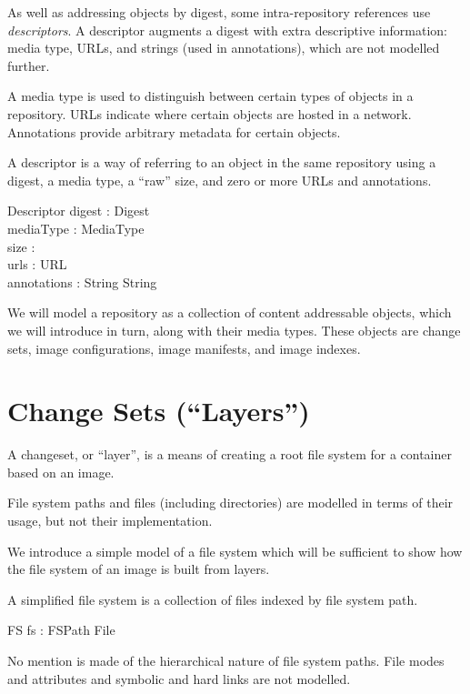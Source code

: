 \documentclass[a4paper,twoside,12pt]{article}
\begin{document}
As well as addressing objects by digest, some intra-repository references use \textit{descriptors}. A descriptor augments a digest with extra descriptive information: media type, URLs, and strings (used in annotations), which are not modelled further.
\begin{zed}
\end{zed}
A media type is used to distinguish between certain types of objects in a repository. URLs indicate where certain objects are hosted in a network. Annotations provide arbitrary metadata for certain objects.

A descriptor is a way of referring to an object in the same repository using a digest, a media type, a ``raw'' size, and zero or more URLs and annotations.
\begin{schema}{Descriptor}
  digest : Digest \\
  mediaType : MediaType \\
  size : \nat \\
  urls : \seq URL \\
  annotations : String \pfun String \\
\end{schema}

We will model a repository as a collection of content addressable objects, which we will introduce in turn, along with their media types.
These objects are change sets, image configurations, image manifests, and image indexes.

\newpage
\section{Change Sets (``Layers'')}

A changeset, or ``layer'', is a means of creating a root file system for a container based on an image.

File system paths and files (including directories) are modelled in terms of their usage, but not their implementation.
\begin{zed}
\end{zed}

We introduce a simple model of a file system which will be sufficient to show how the file system of an image is built from layers.

A simplified file system is a collection of files indexed by file system path.
\begin{schema}{FS}
  fs : FSPath \pfun File \\
\end{schema}
No mention is made of the hierarchical nature of file system paths. File modes and attributes and symbolic and hard links are not modelled.
\end{document}
